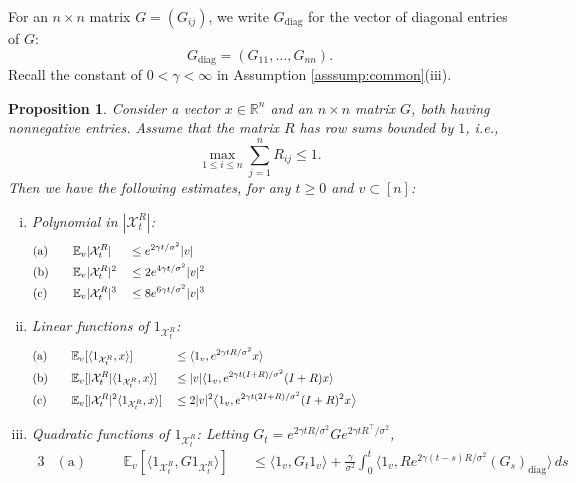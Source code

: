 \documentclass[11pt,reqno]{amsart}
\numberwithin{equation}{section}
\newtheorem{proposition}[theorem]{Proposition}
\theoremstyle{definition}
\def\E{{\mathbb E}}
\def\R{{\mathbb R}}
\def\X{{\mathcal X}}
\begin{document}
For an $n \times n$ matrix $G=(G_{ij})$, we write $G_{\mathrm{diag}}$ for the vector of diagonal entries of $G$:
\begin{equation}
G_{\mathrm{diag}} = (G_{11},\ldots,G_{nn}).
\end{equation}
Recall the constant of $0 < \gamma < \infty$ in Assumption \ref{asssump:common}(iii). 


\begin{proposition} \label{pr:expectations}
Consider a vector $x \in \R^n$ and an $n \times n$ matrix $G$, both having nonnegative entries. Assume that the matrix $R$ has row sums bounded by $1$, i.e., 
			\begin{equation} \tag{R-rows}
		\max_{1\leq i\leq n} \sum_{j=1}^n R_{ij} \leq 1. \label{cond:R row.sum}
	\end{equation}  Then we have the following estimates, for any $t \ge 0$ and $v \subset [n]$:
\begin{enumerate}[(i)]
\item Polynomial in $|\X^{R}_t|$:
\begin{alignat*}{3}
	&(\mathrm{a}) \quad && \E_v|\X^{R}_t|	&&		\le e^{2\gamma t/\sigma^2 }|v|  \\
	&(\mathrm{b}) \quad && \E_v|\X^{R}_t|^2	&&	\le 2 e^{4\gamma t/\sigma^2}|v|^2 \\
	&(\mathrm{c}) \quad && \E_v|\X^{R}_t|^3	&&	\le 8  e^{6\gamma t/\sigma^2} |v|^3 \hphantom{...................................................................................................}
\end{alignat*}
\item Linear functions of $1_{\X^{R}_t}$:
\begin{alignat*}{3}
&(\mathrm{a}) \quad  && \E_v[\langle 1_{\X^{R}_t} , x\rangle]  && \le \langle 1_v, e^{2\gamma t R /\sigma^2}x \rangle \\
&(\mathrm{b}) \quad  && \E_v[|\X^{R}_t|\langle 1_{\X^{R}_t} , x\rangle ] && \le |v|\langle 1_v,e^{2\gamma t (I+R )/\sigma^2}(I+R)x\rangle   \\
&(\mathrm{c}) \quad &&\E_v[|\X^{R}_t|^2\langle 1_{\X^{R}_t} , x\rangle ] && \le 2|v|^2 \big\langle 1_v, e^{2\gamma t (2I+R )/\sigma^2}(I+R )^2 x\big\rangle
\hphantom{.......................................................}
\end{alignat*}
\item Quadratic functions of $1_{\X^{R}_t}$: Letting $G_t=e^{2\gamma t R/\sigma^2} G e^{2\gamma t R^\top/\sigma^2}$,
\begin{alignat*}{3}
&(\mathrm{a}) \quad  && \E_v[ \langle 1_{\X^{R}_t}, G 1_{\X^{R}_t}\rangle ] && \le \big\langle 1_v, G_t 1_v\big\rangle + \frac{\gamma}{\sigma^2} \int_0^t  \big\langle 1_v, R e^{2\gamma (t-s)R/\sigma^2} (G_s)_{\mathrm{diag}}\big\rangle \,ds   \\

\end{alignat*}
\end{enumerate}
\end{proposition}
\end{document}
